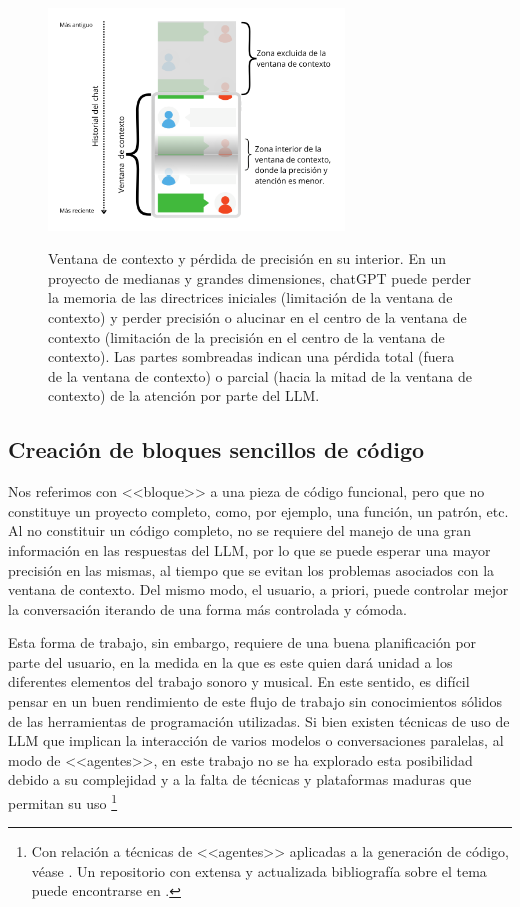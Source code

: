 \begin{figure}[h!]
    \caption[Ventana de contexto y pérdida de precisión en su interior]{Ventana de contexto y pérdida de precisión en su interior. En un proyecto de medianas y grandes dimensiones, chatGPT puede perder la memoria de las directrices iniciales (limitación de la ventana de contexto) y perder precisión o alucinar en el centro de la ventana de contexto (limitación de la precisión en el centro de la ventana de contexto). Las partes sombreadas indican una pérdida total (fuera de la ventana de contexto) o parcial (hacia la mitad de la ventana de contexto) de la atención por parte del LLM.}
    \centering
    \includegraphics[width=0.7\textwidth]{./figuras/chat_ventana_lost_in_the_middle.png}
    \source{\propio}
    \label{fig:chat_ventana_lost_in_the_middle}
\end{figure}


\subsection{Creación de bloques sencillos de código}

Nos referimos con <<bloque>> a una pieza de código funcional, pero que no constituye un proyecto completo, como, por ejemplo, una función, un patrón, etc. Al no constituir un código completo, no se requiere del manejo de una gran información en las respuestas del LLM, por lo que se puede esperar una mayor precisión en las mismas, al tiempo que se evitan los problemas asociados con la ventana de contexto. Del mismo modo, el usuario, a priori, puede controlar mejor la conversación iterando de una forma más controlada y cómoda. 

Esta forma de trabajo, sin embargo, requiere de una buena planificación por parte del usuario, en la medida en la que es este quien dará unidad a los diferentes elementos del trabajo sonoro y musical. En este sentido, es difícil pensar en un buen rendimiento de este flujo de trabajo sin conocimientos sólidos de las herramientas de programación utilizadas. Si bien existen técnicas de uso de LLM que implican la interacción de varios modelos o conversaciones paralelas, al modo de <<agentes>>, en este trabajo no se ha explorado esta posibilidad debido a su complejidad y a la falta de técnicas y plataformas maduras que permitan su uso \footnote{Con relación a técnicas de <<agentes>> aplicadas a la generación de código, véase \cite{huangAgentCoderMultiAgentbasedCode2023}. Un repositorio con extensa y actualizada bibliografía sobre el tema puede encontrarse en \cite{AGIEdgerunnersLLMAgentsPapers2024}.}

